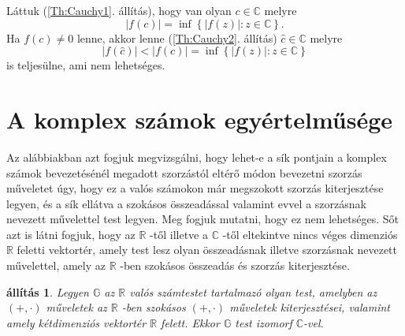 \documentclass[a4paper, showtrims]{memoir}
\makeatletter
\renewenvironment{proof}[1][\proofname]
    {\par\pushQED{\qed}%
    \normalfont \topsep6\p@\@plus6\p@\relax
    \trivlist
    \item[\hskip\labelsep
        \itshape
    #1\@addpunct{:}]\ignorespaces}
    {\popQED\endtrivlist\@endpefalse}
\theoremstyle{plain}
\newtheorem{proposition}{állítás}[chapter]
\theoremstyle{remark}
\theoremstyle{definition}
\makeatother
\begin{document}
\begin{proof}
	Láttuk (\ref{Th:Cauchy1}. állítás), hogy van olyan $c\in \mathbb{C}$ melyre
	\[
		\left| f\left( c\right) \right| =\inf \left\{ \left| f\left( z\right)
		\right| :z\in \mathbb{C}\right\} \text{.}
	\]
	Ha $f(c)\neq 0$ lenne, akkor lenne (\ref{Th:Cauchy2}. állítás) $\hat{c}\in \mathbb{C}$ melyre
	\[
		\left| f\left( \hat{c}\right) \right| <\left| f\left( c\right) \right| =\inf
		\left\{ \left| f\left( z\right) \right| :z\in \mathbb{C}\right\}
	\]
	is teljesülne, ami nem lehetséges.
\end{proof}

\section{A komplex számok egyértelműsége}

Az alábbiakban azt fogjuk megvizsgálni, hogy lehet-e a sík pontjain
a komplex számok bevezetésénél megadott szorzástól eltérő
módon bevezetni szorzás műveletet úgy, hogy ez a valós számokon
már megszokott szorzás kiterjesztése legyen, és a sík ellátva
a szokásos összeadással valamint evvel a szorzásnak nevezett művelettel test legyen.
Meg fogjuk mutatni, hogy ez nem lehetséges.
Sőt
azt is látni fogjuk, hogy az $\mathbb{R}$ -től illetve a $\mathbb{C}$ -től
eltekintve nincs véges dimenziós $\mathbb{R}$ feletti vektortér, amely
test lesz olyan összeadásnak illetve szorzásnak nevezett művelettel,
amely az $\mathbb{R}$ -ben szokásos összeadás és szorzás kiterjesztése.

\begin{proposition}
	\label{Th:CUnique1}Legyen $\mathbb{G}$ az $\mathbb{R}$ valós számtestet
	tartalmazó olyan test, amelyben az $\left( +,\cdot \right) $ műveletek az $\mathbb{R}$ -ben szokásos $\left( +,\cdot \right) $ műveletek kiterjesztései, valamint amely kétdimenziós vektortér $\mathbb{R}$ felett.
	Ekkor $\mathbb{G}$ test izomorf $\mathbb{C}$-vel.
\end{proposition}
\end{document}
